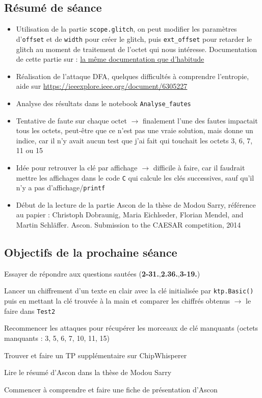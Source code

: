\documentclass[12pt]{article}
\newcommand{\cmark}{\ding{51}}%
\newcommand{\done}{\rlap{$\square$}{\raisebox{2pt}{\large\hspace{1pt}\cmark}}%
	\hspace{-2.5pt}}
\begin{document}
	\subsection{Résumé de séance}
	\begin{itemize}
		\item Utilisation de la partie \verb|scope.glitch|, on peut modifier les paramètres d'\verb|offset| et de \verb|width| pour créer le glitch, puis \verb|ext_offset| pour retarder le glitch au moment de traitement de l'octet qui nous intéresse. Documentation de cette partie sur : \href{https://chipwhisperer.readthedocs.io/en/latest/scope-api.html#chipwhisperer.capture.scopes.cwhardware.ChipWhispererGlitch.GlitchSettings}{la même documentation que d'habitude}
		\item Réalisation de l'attaque DFA, quelques difficultés à comprendre l'entropie, aide sur \url{https://ieeexplore.ieee.org/document/6305227}
		\item Analyse des résultats dans le notebook \verb|Analyse_fautes|
		\item Tentative de faute sur chaque octet $\rightarrow$ finalement l'une des fautes impactait tous les octets, peut-être que ce n'est pas une vraie solution, mais donne un indice, car il n'y avait aucun test que j'ai fait qui touchait les octets 3, 6, 7, 11 ou 15
		\item Idée pour retrouver la clé par affichage $\rightarrow$ difficile à faire, car il faudrait mettre les affichages dans le code \verb|C| qui calcule les clés successives, sauf qu'il n'y a pas d'affichage/\verb|printf|
		\item Début de la lecture de la partie Ascon de la thèse de Modou Sarry, référence au papier : Christoph Dobraunig, Maria Eichlseder, Florian Mendel, and Martin Schläffer. Ascon. Submission to the
		CAESAR competition, 2014
	\end{itemize}
	
	\subsection{Objectifs de la prochaine séance}
	\begin{todolist}
		\item[\done] Essayer de répondre aux questions sautées (\textbf{2-31.},\textbf{2.36.},\textbf{3-19.})
		\item[\done] Lancer un chiffrement d'un texte en clair avec la clé initialisée par \verb|ktp.Basic()| puis en mettant la clé trouvée à la main et comparer les chiffrés obtenus $\rightarrow$ le faire dans \verb|Test2|
		\item[\done] Recommencer les attaques pour récupérer les morceaux de clé manquants (octets manquants : 3, 5, 6, 7, 10, 11, 15)
		\item[\done] Trouver et faire un TP supplémentaire sur ChipWhisperer
		\item[\done] Lire le résumé d'Ascon dans la thèse de Modou Sarry
		\item[\done] Commencer à comprendre et faire une fiche de présentation d'Ascon
	\end{todolist}
	
\end{document}

